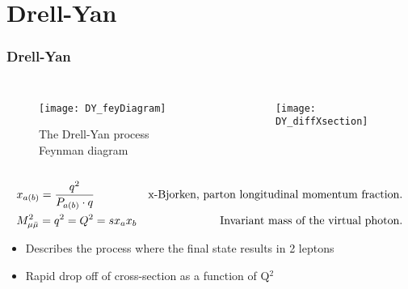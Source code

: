 \ifpdf
\graphicspath{ {Chapters/DrellYan/Figs/} }
\section{Drell-Yan}

\begin{frame}
  \frametitle{Drell-Yan}

  \setlength\abovecaptionskip{-3pt}
  \setlength{\belowcaptionskip}{-25pt}
  \begin{columns}
    \begin{figure}
      \vspace*{-1.2cm}
      \texttt{[image: DY\_feyDiagram]}
      \caption{The Drell-Yan process Feynman diagram}
    \end{figure}
    \begin{figure}
      \vspace*{-1.2cm}
      \texttt{[image: DY\_diffXsection]}
    \end{figure}  
  \end{columns}
  
  \begin{subequations}
    \vspace*{-0.6cm}
    \begin{align*}
      &x_{a(b)} = \frac{q^2}{P_{a(b)} \cdot q} & \text{x-Bjorken,
        parton longitudinal momentum fraction.}\\ &M_{\mu\bar{\mu}}^2 = q^2 = Q^2 = sx_ax_b
      & \text{Invariant mass of the virtual photon.}
    \end{align*}
  \end{subequations}
  
  \begin{itemize}
  \item Describes the process where the final state results in 2
    leptons
  \item Rapid drop off of cross-section as a function of Q$^2$
  \end{itemize}
\end{frame}


